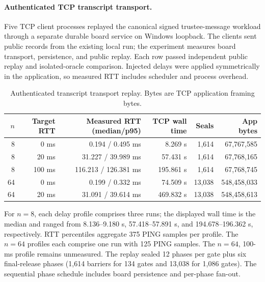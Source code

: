 \paragraph{Authenticated TCP transcript transport.}
Five TCP client processes replayed the canonical signed trustee-message workload through a separate durable board service on Windows loopback. The clients sent public records from the existing local run; the experiment measures board transport, persistence, and public replay. Each row passed independent public replay and isolated-oracle comparison. Injected delays were applied symmetrically in the application, so measured RTT includes scheduler and process overhead.

\begin{table}[t]
\centering
\caption{Authenticated transcript transport replay. Bytes are TCP application framing bytes.}
\label{tab:network-transport}
\begin{tabular}{rrrrrr}
\hline
$n$ & Target RTT & Measured RTT (median/p95) & TCP wall time & Seals & App bytes \\
\hline
8 & 0 ms & 0.194 / 0.495 ms & 8.269 s & 1,614 & 67,767,585 \\
8 & 20 ms & 31.227 / 39.989 ms & 57.431 s & 1,614 & 67,768,165 \\
8 & 100 ms & 116.213 / 126.381 ms & 195.861 s & 1,614 & 67,768,745 \\
64 & 0 ms & 0.199 / 0.332 ms & 74.509 s & 13,038 & 548,458,033 \\
64 & 20 ms & 31.091 / 39.614 ms & 469.832 s & 13,038 & 548,458,613 \\
\hline
\end{tabular}
\end{table}

For $n=8$, each delay profile comprises three runs; the displayed wall time is the median and ranged from 8.136--9.180 s, 57.418--57.891 s, and 194.678--196.362 s, respectively. RTT percentiles aggregate 375 PING samples per profile. The $n=64$ profiles each comprise one run with 125 PING samples. The $n=64$, 100-ms profile remains unmeasured. The replay sealed 12 phases per gate plus six final-release phases (1,614 barriers for 134 gates and 13,038 for 1,086 gates). The sequential phase schedule includes board persistence and per-phase fan-out.
